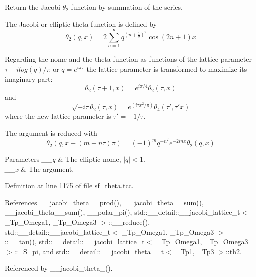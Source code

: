 Return the Jacobi $ \theta_2 $ function by summation of the series.

The Jacobi or elliptic theta function is defined by \[ \theta_2(q,x) = 2\sum_{n=1}^{\infty} q^{(n+\frac{1}{2})^2}\cos{(2n+1)x} \]

Regarding the nome and the theta function as functions of the lattice parameter $ \tau -i log(q)/ \pi $ or $ q = e^{i\pi\tau} $ the lattice parameter is transformed to maximize its imaginary part\+: \[ \theta_2(\tau+1,x) = e^{i\pi/4}\theta_2(\tau,x) \] and \[ \sqrt{-i\tau}\theta_2(\tau,x) = e^{(i\tau x^2/\pi)}\theta_4(\tau',\tau' x) \] where the new lattice parameter is $ \tau' = -1/\tau $.

The argument is reduced with \[ \theta_2(q, x + (m+n\tau)\pi) = (-1)^{m}q^{-n^2}e^{-2inx}\theta_2(q, x) \]


\begin{DoxyParams}{Parameters}
{\em \+\_\+\+\_\+q} & The elliptic nome, $ |q| < 1 $. \\
\hline
{\em \+\_\+\+\_\+x} & The argument. \\
\hline
\end{DoxyParams}


Definition at line 1175 of file sf\+\_\+theta.\+tcc.



References \+\_\+\+\_\+jacobi\+\_\+theta\+\_\+\_\+prod(), \+\_\+\+\_\+jacobi\+\_\+theta\+\_\+\_\+sum(), \+\_\+\+\_\+jacobi\+\_\+theta\+\_\+\_\+sum(), \+\_\+\+\_\+polar\+\_\+pi(), std\+::\+\_\+\+\_\+detail\+::\+\_\+\+\_\+jacobi\+\_\+lattice\+\_\+t$<$ \+\_\+\+Tp\+\_\+\+Omega1, \+\_\+\+Tp\+\_\+\+Omega3 $>$\+::\+\_\+\+\_\+reduce(), std\+::\+\_\+\+\_\+detail\+::\+\_\+\+\_\+jacobi\+\_\+lattice\+\_\+t$<$ \+\_\+\+Tp\+\_\+\+Omega1, \+\_\+\+Tp\+\_\+\+Omega3 $>$\+::\+\_\+\+\_\+tau(), std\+::\+\_\+\+\_\+detail\+::\+\_\+\+\_\+jacobi\+\_\+lattice\+\_\+t$<$ \+\_\+\+Tp\+\_\+\+Omega1, \+\_\+\+Tp\+\_\+\+Omega3 $>$\+::\+\_\+\+S\+\_\+pi, and std\+::\+\_\+\+\_\+detail\+::\+\_\+\+\_\+jacobi\+\_\+theta\+\_\+\_\+t$<$ \+\_\+\+Tp1, \+\_\+\+Tp3 $>$\+::th2.



Referenced by \+\_\+\+\_\+jacobi\+\_\+theta\+\_().

\mbox{\label{namespacestd_1_1____detail_a5aace3bea7c88443d5bceb503a0452d0}} 
